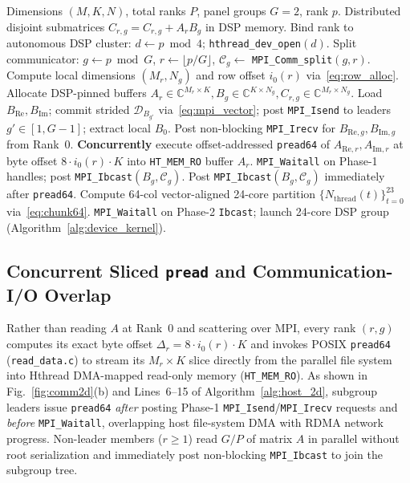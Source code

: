 \documentclass[conference]{IEEEtran}
\begin{document}
\begin{algorithm}[t]
\caption{Host-Side 2D Hybrid Orchestration \& Overlapped Pipeline}
\label{alg:host_2d}
\footnotesize
\begin{algorithmic}[1]
\REQUIRE Dimensions $(M, K, N)$, total ranks $P$, panel groups $G=2$, rank $p$.
\ENSURE Distributed disjoint submatrices $C_{r,g} = C_{r,g} + A_r B_g$ in DSP memory.
\STATE Bind rank to autonomous DSP cluster: $d \leftarrow p \bmod 4$; \texttt{hthread\_dev\_open}$(d)$.
\STATE Split communicator: $g \leftarrow p \bmod G$, $r \leftarrow \lfloor p / G \rfloor$, $\mathcal{C}_g \leftarrow$ \texttt{MPI\_Comm\_split}$(g, r)$.
\STATE Compute local dimensions $(M_r, N_g)$ and row offset $i_0(r)$ via~\eqref{eq:row_alloc}.
\STATE Allocate DSP-pinned buffers $A_r \in \mathbb{C}^{M_r \times K}, B_g \in \mathbb{C}^{K \times N_g}, C_{r,g} \in \mathbb{C}^{M_r \times N_g}$.
    \STATE Load $B_{\mathrm{Re}}, B_{\mathrm{Im}}$; commit strided $\mathcal{D}_{B_{g'}}$ via~\eqref{eq:mpi_vector}; post \texttt{MPI\_Isend} to leaders $g' \in [1, G-1]$; extract local $B_0$. 
    \STATE Post non-blocking \texttt{MPI\_Irecv} for $B_{\mathrm{Re},g}, B_{\mathrm{Im},g}$ from Rank~0.
\ENDIF
\STATE \textbf{Concurrently} execute offset-addressed \texttt{pread64} of $A_{\mathrm{Re},r}, A_{\mathrm{Im},r}$ at byte offset $8 \cdot i_0(r) \cdot K$ into \texttt{HT\_MEM\_RO} buffer $A_r$. 
    \STATE \texttt{MPI\_Waitall} on Phase-1 handles; post \texttt{MPI\_Ibcast}$(B_g, \mathcal{C}_g)$.
\ELSE
    \STATE Post \texttt{MPI\_Ibcast}$(B_g, \mathcal{C}_g)$ immediately after \texttt{pread64}. 
\ENDIF
\STATE Compute 64-col vector-aligned 24-core partition $\{N_{\mathrm{thread}}(t)\}_{t=0}^{23}$ via~\eqref{eq:chunk64}.
\STATE \texttt{MPI\_Waitall} on Phase-2 \texttt{Ibcast}; launch 24-core DSP group (Algorithm~\ref{alg:device_kernel}).
\end{algorithmic}
\end{algorithm}

\subsection{Concurrent Sliced \texttt{pread} and Communication-I/O Overlap}
Rather than reading $A$ at Rank~0 and scattering over MPI, every rank $(r, g)$ computes its exact byte offset $\Delta_r = 8 \cdot i_0(r) \cdot K$ and invokes POSIX \texttt{pread64} (\texttt{read\_data.c}) to stream its $M_r \times K$ slice directly from the parallel file system into Hthread DMA-mapped read-only memory (\texttt{HT\_MEM\_RO}). As shown in Fig.~\ref{fig:comm2d}(b) and Lines~6--15 of Algorithm~\ref{alg:host_2d}, subgroup leaders issue \texttt{pread64} \emph{after} posting Phase-1 \texttt{MPI\_Isend}/\texttt{MPI\_Irecv} requests and \emph{before} \texttt{MPI\_Waitall}, overlapping host file-system DMA with RDMA network progress. Non-leader members ($r \ge 1$) read $G/P$ of matrix $A$ in parallel without root serialization and immediately post non-blocking \texttt{MPI\_Ibcast} to join the subgroup tree.
\end{document}
